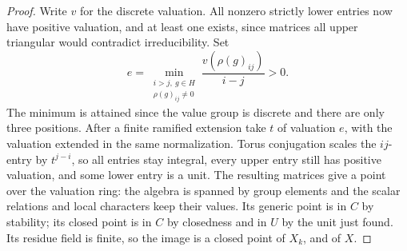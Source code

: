 \documentclass[a4paper,11pt]{article}
\theoremstyle{definition}
\theoremstyle{remark}
\numberwithin{equation}{section}
\begin{document}
\begin{proof}
Write \(v\) for the discrete valuation. All nonzero strictly
lower entries now have positive valuation, and at least one
exists, since matrices all upper triangular would contradict
irreducibility. Set
\[
       e=\min_{\substack{i>j,\ g\in H\\ \rho(g)_{ij}\ne0}}
                         \frac{v(\rho(g)_{ij})}{i-j}>0 .
\]
The minimum is attained since the value group is discrete
and there are only three positions. After a finite ramified
extension take \(t\) of valuation \(e\), with the valuation
extended in the same normalization. Torus conjugation scales
the \(ij\)-entry by \(t^{j-i}\), so all entries stay integral,
every upper entry still has positive valuation, and some lower
entry is a unit. The resulting matrices give a point over the
valuation ring: the algebra is spanned by group elements and
the scalar relations and local characters keep their values.
Its generic point is in \(C\) by stability; its closed point
is in \(C\) by closedness and in \(U\) by the unit just found.
Its residue field is finite, so the image is a closed point
of \(X_k\), and of \(X\).
\end{proof}
\end{document}
